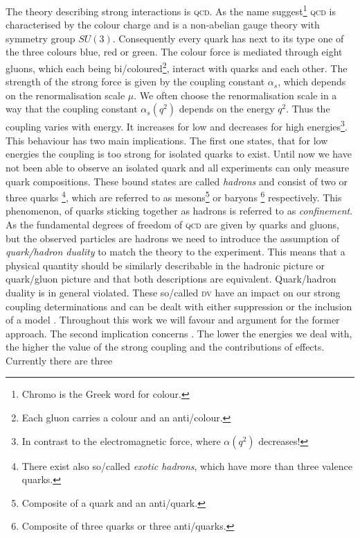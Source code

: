 \documentclass[../../index.tex]{subfiles}
\begin{document}
The theory describing strong interactions is \textsc{qcd}. As the name
suggest\footnote{Chromo is the Greek word for colour.} \textsc{qcd} is
characterised by the colour charge and is a non-abelian gauge theory with
symmetry group \(SU(3)\). Consequently every quark has next to its type one of
the three colours blue, red or green. The colour force is mediated through eight
gluons, which each being bi\-/coloured\footnote{Each gluon carries a colour and
  an anti\-/colour.}, interact with quarks and each other. The strength of the
strong force is given by the coupling constant \(\alpha_s\), which depends on
the renormalisation scale \(\mu\). We often choose the renormalisation scale in
a way that the coupling constant \(\alpha_s(q^2)\) depends on the energy
\(q^2\). Thus the coupling varies with energy. It increases for low and
decreases for high energies\footnote{In contrast to the electromagnetic force,
  where \(\alpha(q^2)\) decreases!}. This behaviour has two main implications.
The first one states, that for low energies the coupling is too strong for
isolated quarks to exist. Until now we have not been able to observe an isolated
quark and all experiments can only measure quark compositions. These bound
states are called \textit{hadrons} and consist of two or three quarks
\footnote{There exist also so\-/called \textit{exotic hadrons}, which have more
  than three valence quarks.}, which are referred to as
mesons\footnote{Composite of a quark and an anti\-/quark.} or baryons
\footnote{Composite of three quarks or three anti\-/quarks.} respectively. This
phenomenon, of quarks sticking together as hadrons is referred to as
\textit{confinement}. As the fundamental degrees of freedom of \textsc{qcd} are
given by quarks and gluons, but the observed particles are hadrons we need to
introduce the assumption of \textit{quark\-/hadron duality} to match the theory
to the experiment. This means that a physical quantity should be similarly
describable in the hadronic picture or quark\-/gluon picture and that both
descriptions are equivalent. Quark\-/hadron duality is in general violated.
These so\-/called \textsc{dv} have an impact on our strong
coupling determinations and can be dealt with either suppression or the
inclusion of a model \cite{Cata2008}. Throughout this work we will favour and
argument for the former approach. The second implication concerns
. The lower the energies we deal with, the
higher the value of the strong coupling and the contributions of
 effects. Currently there are three
\end{document}
